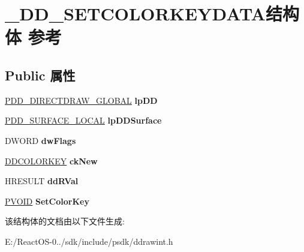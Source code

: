 \hypertarget{struct___d_d___s_e_t_c_o_l_o_r_k_e_y_d_a_t_a}{}\section{\+\_\+\+D\+D\+\_\+\+S\+E\+T\+C\+O\+L\+O\+R\+K\+E\+Y\+D\+A\+T\+A结构体 参考}
\label{struct___d_d___s_e_t_c_o_l_o_r_k_e_y_d_a_t_a}
\subsection*{Public 属性}
\begin{DoxyCompactItemize}
\item 
\mbox{\label{struct___d_d___s_e_t_c_o_l_o_r_k_e_y_d_a_t_a_a43c4dedea31897b639e8b5839594cbce}} 
\hyperlink{struct___d_d___d_i_r_e_c_t_d_r_a_w___g_l_o_b_a_l}{P\+D\+D\+\_\+\+D\+I\+R\+E\+C\+T\+D\+R\+A\+W\+\_\+\+G\+L\+O\+B\+AL} {\bfseries lp\+DD}
\item 
\mbox{\label{struct___d_d___s_e_t_c_o_l_o_r_k_e_y_d_a_t_a_a2f5e1c33b1233bb2c552341db4ffb74c}} 
\hyperlink{struct___d_d___s_u_r_f_a_c_e___l_o_c_a_l}{P\+D\+D\+\_\+\+S\+U\+R\+F\+A\+C\+E\+\_\+\+L\+O\+C\+AL} {\bfseries lp\+D\+D\+Surface}
\item 
\mbox{\label{struct___d_d___s_e_t_c_o_l_o_r_k_e_y_d_a_t_a_adfda6d0369686336a06dd4ed5b4f199a}} 
D\+W\+O\+RD {\bfseries dw\+Flags}
\item 
\mbox{\label{struct___d_d___s_e_t_c_o_l_o_r_k_e_y_d_a_t_a_a8293cc8308e5841f965bad73a3879908}} 
\hyperlink{struct_d_d_c_o_l_o_r_k_e_y}{D\+D\+C\+O\+L\+O\+R\+K\+EY} {\bfseries ck\+New}
\item 
\mbox{\label{struct___d_d___s_e_t_c_o_l_o_r_k_e_y_d_a_t_a_a55a09702ddfd7abf0dde9c6b7a04872f}} 
H\+R\+E\+S\+U\+LT {\bfseries dd\+R\+Val}
\item 
\mbox{\label{struct___d_d___s_e_t_c_o_l_o_r_k_e_y_d_a_t_a_a35a3fa2f2def2ab7173c15ddcf729938}} 
\hyperlink{interfacevoid}{P\+V\+O\+ID} {\bfseries Set\+Color\+Key}
\end{DoxyCompactItemize}


该结构体的文档由以下文件生成\+:\begin{DoxyCompactItemize}
\item 
E\+:/\+React\+O\+S-\/0../sdk/include/psdk/ddrawint.\+h\end{DoxyCompactItemize}
